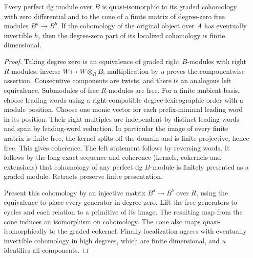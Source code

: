 \documentclass[11pt]{article}
\begin{document}
\begin{lem}\label{chart}
Every perfect dg module over $B$ is quasi-isomorphic to its graded
cohomology with zero differential and to the cone of a finite matrix
of degree-zero free modules $B^a\to B^b$. If the cohomology of the
original object over $A$ has eventually invertible $h$, then the
degree-zero part of its localized cohomology is finite dimensional.
\end{lem}
\begin{proof}
Taking degree zero is an equivalence of graded right $B$-modules with
right $R$-modules, inverse $W\mapsto W\otimes_R B$; multiplication
by $u$ proves the componentwise assertion. Consecutive components are
twists, and there is an analogous left equivalence. Submodules of free
$R$-modules are free. For a finite ambient basis, choose leading words
using a right-compatible degree-lexicographic order with a module
position. Choose one monic vector for each prefix-minimal leading word
in its position. Their right multiples are independent by distinct
leading words and span by leading-word reduction. In particular the
image of every finite matrix is finite free, the kernel splits off
the domain and is finite projective, hence free. This gives coherence.
The left statement follows by reversing words. It follows by the long
exact sequence and coherence (kernels, cokernels and extensions) that
cohomology of any perfect dg $B$-module is finitely presented as a
graded module. Retracts preserve finite presentation.

Present this cohomology by an injective matrix $B^a\to B^b$ over $R$,
using the equivalence to place every generator in degree zero. Lift the
free generators to cycles and each relation to a primitive of its image.
The resulting map from the cone induces an isomorphism on cohomology.
The cone also maps quasi-isomorphically to the graded cokernel. Finally
localization agrees with eventually invertible cohomology in high
degrees, which are finite dimensional, and $u$ identifies all components.
\end{proof}
\end{document}
